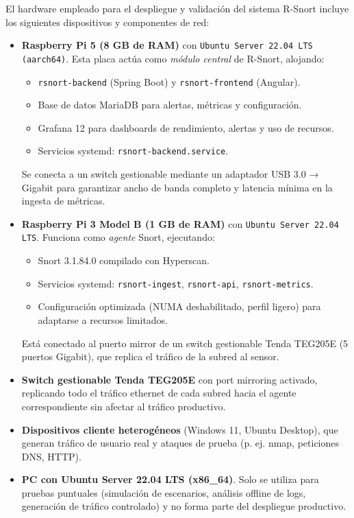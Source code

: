 \documentclass[11pt,a4paper,twoside]{report}
\begin{document}
El hardware empleado para el despliegue y validación del sistema R-Snort incluye los siguientes dispositivos y componentes de red:

\begin{itemize}
	\item \textbf{Raspberry Pi 5 (8 GB de RAM)} con \texttt{Ubuntu Server 22.04 LTS (aarch64)}. Esta placa actúa como \emph{módulo central} de R-Snort, alojando:
	\begin{itemize}
		\item \texttt{rsnort-backend} (Spring Boot) y \texttt{rsnort-frontend} (Angular).
		\item Base de datos MariaDB para alertas, métricas y configuración.
		\item Grafana 12 para dashboards de rendimiento, alertas y uso de recursos.
		\item Servicios systemd: \texttt{rsnort-backend.service}.
	\end{itemize}
	Se conecta a un switch gestionable mediante un adaptador USB 3.0 → Gigabit para garantizar ancho de banda completo y latencia mínima en la ingesta de métricas.
	
	\item \textbf{Raspberry Pi 3 Model B (1 GB de RAM)} con \texttt{Ubuntu Server 22.04 LTS}. Funciona como \emph{agente} Snort, ejecutando:
	\begin{itemize}
		\item Snort 3.1.84.0 compilado con Hyperscan.
		\item Servicios systemd: \texttt{rsnort-ingest}, \texttt{rsnort-api}, \texttt{rsnort-metrics}.
		\item Configuración optimizada (NUMA deshabilitado, perfil ligero) para adaptarse a recursos limitados.
	\end{itemize}
	Está conectado al puerto mirror de un switch gestionable Tenda TEG205E (5 puertos Gigabit), que replica el tráfico de la subred al sensor.
	
	\item \textbf{Switch gestionable Tenda TEG205E} con port mirroring activado, replicando todo el tráfico ethernet de cada subred hacia el agente correspondiente sin afectar al tráfico productivo.
	
	\item \textbf{Dispositivos cliente heterogéneos} (Windows 11, Ubuntu Desktop), que generan tráfico de usuario real y ataques de prueba (p. ej. nmap, peticiones DNS, HTTP).
	
	\item \textbf{PC con Ubuntu Server 22.04 LTS (x86\_64)}. Solo se utiliza para pruebas puntuales (simulación de escenarios, análisis offline de logs, generación de tráfico controlado) y no forma parte del despliegue productivo.
\end{itemize}
\end{document}
